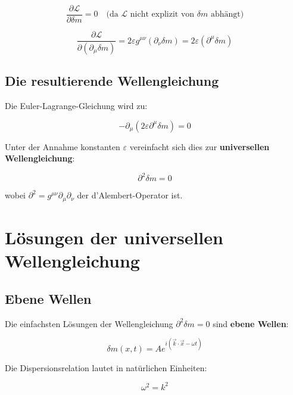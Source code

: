 \documentclass[12pt,a4paper]{report}
\begin{document}
	\begin{equation}
		\frac{\partial\mathcal{L}}{\partial\delta m} = 0 \quad \text{(da $\mathcal{L}$ nicht explizit von $\delta m$ abhängt)}
	\end{equation}
	
	\begin{equation}
		\frac{\partial\mathcal{L}}{\partial(\partial_\mu\delta m)} = 2\varepsilon g^{\mu\nu} (\partial_\nu\delta m) = 2\varepsilon (\partial^\mu\delta m)
	\end{equation}
	
	\subsection{Die resultierende Wellengleichung}
	
	Die Euler-Lagrange-Gleichung wird zu:
	
	\begin{equation}
		-\partial_\mu(2\varepsilon \partial^\mu\delta m) = 0
	\end{equation}
	
	Unter der Annahme konstanten $\varepsilon$ vereinfacht sich dies zur \textbf{universellen Wellengleichung}:
	
	\begin{equation}
		\partial^2\delta m = 0
	\end{equation}
	
	wobei $\partial^2 = g^{\mu\nu} \partial_\mu\partial_\nu$ der d'Alembert-Operator ist.
	
	\section{Lösungen der universellen Wellengleichung}
	
	\subsection{Ebene Wellen}
	
	Die einfachsten Lösungen der Wellengleichung $\partial^2\delta m = 0$ sind \textbf{ebene Wellen}:
	
	\begin{equation}
		\delta m(x,t) = A e^{i(\vec{k} \cdot \vec{x} - \omega t)}
	\end{equation}
	
	Die Dispersionsrelation lautet in natürlichen Einheiten:
	
	\begin{equation}
		\omega^2 = k^2
	\end{equation}
	
\end{document}
